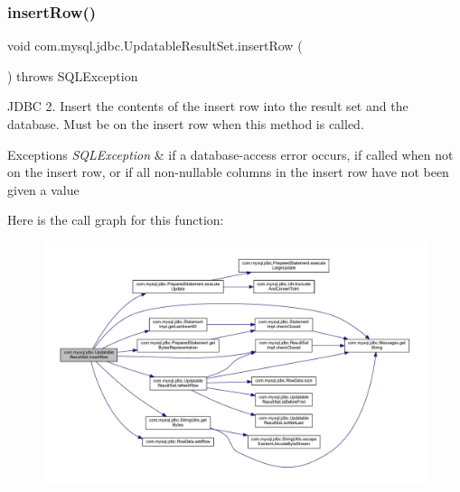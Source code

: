 \subsubsection{\texorpdfstring{insert\+Row()}{insertRow()}}
{\footnotesize\ttfamily void com.\+mysql.\+jdbc.\+Updatable\+Result\+Set.\+insert\+Row (\begin{DoxyParamCaption}{ }\end{DoxyParamCaption}) throws S\+Q\+L\+Exception}

J\+D\+BC 2. Insert the contents of the insert row into the result set and the database. Must be on the insert row when this method is called.


\begin{DoxyExceptions}{Exceptions}
{\em S\+Q\+L\+Exception} & if a database-\/access error occurs, if called when not on the insert row, or if all non-\/nullable columns in the insert row have not been given a value \\
\hline
\end{DoxyExceptions}
Here is the call graph for this function\+:
\nopagebreak
\begin{figure}[H]
\begin{center}
\leavevmode
\includegraphics[width=350pt]{classcom_1_1mysql_1_1jdbc_1_1_updatable_result_set_aef041f8d9d0778083716fc26652648fa_cgraph}
\end{center}
\end{figure}
\mbox{\label{classcom_1_1mysql_1_1jdbc_1_1_updatable_result_set_a065b1afc8c2a8c2370877d34ba2fc5ed}} 

